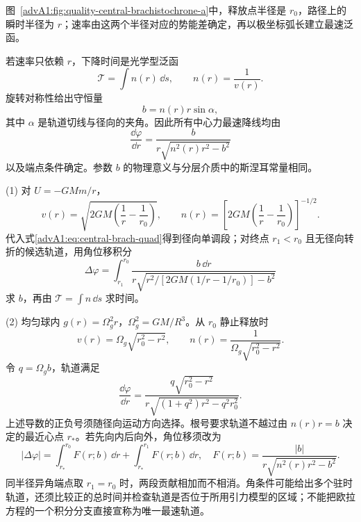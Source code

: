 \begin{advsolution}
\begin{qualityfigure}
\label{advA1:fig:quality-central-brachistochrone-a}
\end{qualityfigure}
图~\ref{advA1:fig:quality-central-brachistochrone-a}中，释放点半径是 $r_0$，路径上的瞬时半径为 $r$；速率由这两个半径对应的势能差确定，再以极坐标弧长建立最速泛函。

若速率只依赖 $r$，下降时间是光学型泛函
\[
 \mathcal T=\int n(r)\,\dd s,\qquad n(r)=\frac1{v(r)}.
\]
旋转对称性给出守恒量
\[
 b=n(r)r\sin\alpha,
\]
其中 $\alpha$ 是轨道切线与径向的夹角。因此所有中心力最速降线均由
\begin{equation}\label{advA1:eq:central-brach-quad}
 \frac{\dd\varphi}{\dd r}
 =\frac{b}{r\sqrt{n^2(r)r^2-b^2}}
\end{equation}
以及端点条件确定。参数 $b$ 的物理意义与分层介质中的斯涅耳常量相同。

(1) 对 $U=-GMm/r$，
\[
 v(r)=\sqrt{2GM\left(\frac1r-\frac1{r_0}\right)},\qquad
 n(r)=\left[2GM\left(\frac1r-\frac1{r_0}\right)\right]^{-1/2}.
\]
代入式\eqref{advA1:eq:central-brach-quad}得到径向单调段；对终点 $r_1<r_0$ 且无径向转折的候选轨道，用角位移积分
\[
 \Delta\varphi=\int_{r_1}^{r_0}
 \frac{b\,\dd r}{r\sqrt{r^2/[2GM(1/r-1/r_0)]-b^2}}
\]
求 $b$，再由 $\mathcal T=\int n\,\dd s$ 求时间。

(2) 均匀球内 $g(r)=\Omega_g^2r$，$\Omega_g^2=GM/R^3$。从 $r_0$ 静止释放时
\[
 v(r)=\Omega_g\sqrt{r_0^2-r^2},\qquad
 n(r)=\frac1{\Omega_g\sqrt{r_0^2-r^2}}.
\]
令 $q=\Omega_g b$，轨道满足
\[
 \frac{\dd\varphi}{\dd r}
 =\frac{q\sqrt{r_0^2-r^2}}
 {r\sqrt{(1+q^2)r^2-q^2r_0^2}}.
\]
上述导数的正负号须随径向运动方向选择。根号要求轨道不越过由
$n(r)r=b$ 决定的最近心点 $r_*$。若先向内后向外，角位移须改为
\[
 |\Delta\varphi|=\int_{r_*}^{r_0}F(r;b)\,\dd r
 +\int_{r_*}^{r_1}F(r;b)\,\dd r,
 \quad F(r;b)=\frac{|b|}{r\sqrt{n^2(r)r^2-b^2}}.
\]
同半径异角端点取 $r_1=r_0$ 时，两段贡献相加而不相消。角条件可能给出多个驻时轨道，还须比较正的总时间并检查轨道是否位于所用引力模型的区域；不能把欧拉方程的一个积分分支直接宣称为唯一最速轨道。
\end{advsolution}

